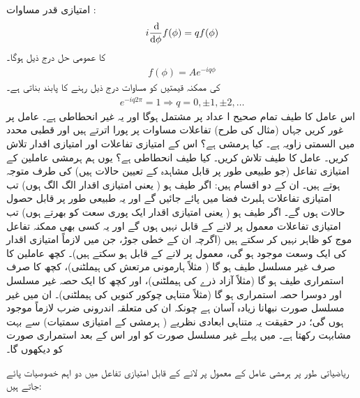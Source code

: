  امتیازی قدر مساوات :
\begin{align}
	i\frac{\dif}{\dif \phi}f(\phi) = qf(\phi)
\end{align}
کا عمومی حل درج ذیل ہوگا۔
\begin{align}
	f(\phi) = Ae^{-iq\phi}
\end{align}
  کی ممکنہ قیمتیں  کو مساوات  درج ذیل  رہنے کا پابند بناتی ہے۔
\begin{align}
	e^{-iq2\pi} = 1 \Rightarrow q = 0, \pm1, \pm2, \dots
\end{align}
اس عامل کا طیف تمام صحیح ا عداد  پر مشتمل ہوگا اور یہ غیر انحطاطی ہے۔
عامل  پر غور کریں جہاں (مثال  کی طرح) تفاعلات مساوات  پر پورا اترتے ہیں اور  قطبی محدد میں السمتی زاویہ ہے۔ کیا  ہرمشی ہے؟ اس کے امتیازی تفاعلات اور امتیازی اقدار تلاش کریں۔ عامل  کا طیف تلاش کریں۔ کیا طیف انحطاطی ہے؟
یوں ہم ہرمشی عاملین کے امتیازی تفاعل  (جو طبیعی طور پر قابل مشاہدہ کے تعیین حالات ہیں)   کی طرف متوجہ ہوتے ہیں۔ ان کے دو اقسام ہیں: اگر طیف  ہو ( یعنی امتیازی اقدار الگ الگ ہوں) تب امتیازی تفاعلات ہلبرٹ فضا میں پائے جائیں گے اور یہ طبیعی طور پر قابل حصول حالات ہوں گے۔ اگر طیف  ہو ( یعنی امتیازی اقدار ایک پوری سعت کو بھرتے ہوں) تب امتیازی تفاعلات معمول پر لانے کے قابل نہیں ہوں گے اور یہ کسی بھی ممکنہ تفاعل موج کو ظاہر نہیں کر سکتے ہیں (اگرچہ ان کے خطی جوڑ، جن میں لازماً امتیازی اقدار کی ایک وسعت موجود ہو گی، معمول پر لانے کے قابل ہو سکتے ہیں)۔ کچھ عاملین کا صرف غیر مسلسل طیف ہو گا ( مثلاً ہارمونی مرتعش کی ہیملٹنی)، کچھ کا صرف استمراری طیف ہو گا (مثلاً آزاد ذرے  کی ہیملٹنی)، اور کچھ کا ایک حصہ غیر مسلسل اور دوسرا حصہ استمراری ہو گا (مثلاً متناہی چوکور  کنویں کی ہیملٹنی)۔ ان میں غیر مسلسل صورت نبھانا زیادہ آسان ہے چونکہ ان کی متعلقہ اندرونی ضرب لازماً موجود ہوں گی؛ در حقیقت یہ متناہی ابعادی نظریے  ( ہرمشی  کے امتیازی سمتیات)  سے بہت مشابہت رکھتا ہے۔ میں پہلے غیر مسلسل صورت کو اور اس کے بعد استمراری صورت کو دیکھوں گا۔ 

ریاضیاتی طور پر ہرمشی عامل کے معمول پر لانے کے قابل امتیازی تفاعل  میں  دو اہم خصوصیات پائے جاتے ہیں:
 
